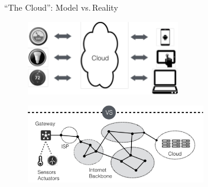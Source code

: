 \begin{frame}{``The Cloud'': Model vs.\,Reality}
  \begin{figure}
    \includegraphics[width=0.6\textwidth]{figures/cloud-view.pdf}
  \end{figure}
  \vspace{-3em}
  \pause
  \begin{figure}
    \includegraphics[width=0.7\textwidth]{figures/cloud-reality.pdf}
  \end{figure}
\end{frame}

